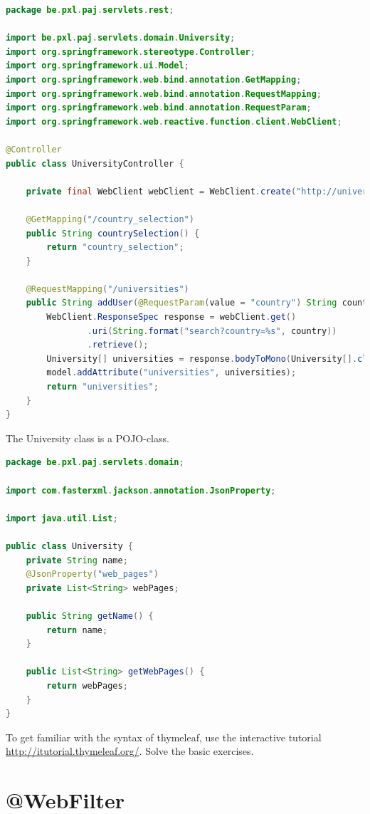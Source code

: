 \begin{lstlisting}[language=java, frame=single]
package be.pxl.paj.servlets.rest;

import be.pxl.paj.servlets.domain.University;
import org.springframework.stereotype.Controller;
import org.springframework.ui.Model;
import org.springframework.web.bind.annotation.GetMapping;
import org.springframework.web.bind.annotation.RequestMapping;
import org.springframework.web.bind.annotation.RequestParam;
import org.springframework.web.reactive.function.client.WebClient;

@Controller
public class UniversityController {

	private final WebClient webClient = WebClient.create("http://universities.hipolabs.com");

	@GetMapping("/country_selection")
	public String countrySelection() {
		return "country_selection";
	}

	@RequestMapping("/universities")
	public String addUser(@RequestParam(value = "country") String country, Model model) {
		WebClient.ResponseSpec response = webClient.get()
				.uri(String.format("search?country=%s", country))
				.retrieve();
		University[] universities = response.bodyToMono(University[].class).block();
		model.addAttribute("universities", universities);
		return "universities";
	}
}

\end{lstlisting}

The University class is a POJO-class.

\begin{lstlisting}[language=java, frame=single]
package be.pxl.paj.servlets.domain;

import com.fasterxml.jackson.annotation.JsonProperty;

import java.util.List;

public class University {
	private String name;
	@JsonProperty("web_pages")
	private List<String> webPages;

	public String getName() {
		return name;
	}

	public List<String> getWebPages() {
		return webPages;
	}
}
\end{lstlisting}


\begin{oefening}
To get familiar with the syntax of thymeleaf, use the interactive tutorial \url{http://itutorial.thymeleaf.org/}.  Solve the basic exercises. 
\end{oefening}


\section{@WebFilter}

